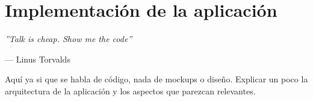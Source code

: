 \chapter{Implementación de la aplicación}

\epigraph{\textit{''Talk is cheap. Show me the code''}}{--- Linus Torvalds}

{\color{red} Aquí ya si que se habla de código, nada de mockups o diseño. Explicar un poco la arquitectura de la aplicación y los aspectos que parezcan relevantes.}